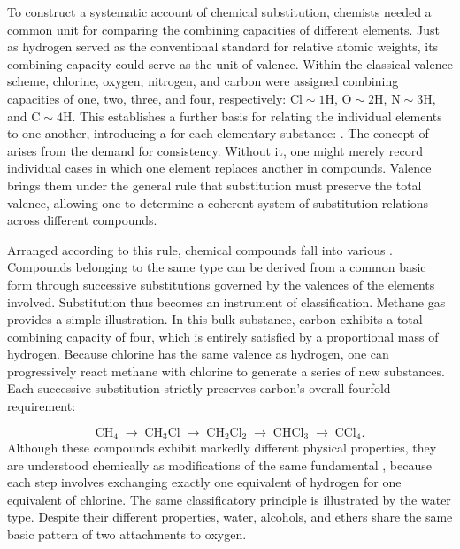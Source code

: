 \documentclass[submitted,12pt]{article}
\begin{document}
To construct a systematic account of chemical substitution, chemists needed a common unit for comparing the combining capacities of different elements. Just as hydrogen served as the conventional standard for relative atomic weights, its combining capacity could serve as the unit of valence. Within the classical valence scheme, chlorine, oxygen, nitrogen, and carbon were assigned combining capacities of one, two, three, and four, respectively: $\mathrm{Cl}\sim 1\mathrm{H}$, $\mathrm{O}\sim 2\mathrm{H}$, $\mathrm{N}\sim 3\mathrm{H}$, and $\mathrm{C}\sim 4\mathrm{H}$. This establishes a further basis for relating the individual elements to one another, introducing a  for each elementary substance:  . The concept of  arises from the demand for consistency.  Without it, one might merely record individual cases in which one element replaces another in compounds. Valence brings them under the general rule that substitution must preserve the total valence, allowing one to determine a coherent system of substitution relations across different compounds.

Arranged according to this rule, chemical compounds fall into various   . Compounds belonging to the same type can be derived from a common basic form through successive substitutions governed by the valences of the elements involved. Substitution thus becomes an instrument of classification. Methane gas provides a simple illustration. In this bulk substance, carbon exhibits a total combining capacity of four, which is entirely satisfied by a proportional mass of hydrogen. Because chlorine has the same valence as hydrogen, one can progressively react methane with chlorine to generate a series of new substances. Each successive substitution strictly preserves carbon's overall fourfold requirement: 

\[
\mathrm{CH}_4
\;\longrightarrow\;
\mathrm{CH}_3\mathrm{Cl}
\;\longrightarrow\;
\mathrm{CH}_2\mathrm{Cl}_2
\;\longrightarrow\;
\mathrm{CHCl}_3
\;\longrightarrow\;
\mathrm{CCl}_4.
\]
%
Although these compounds exhibit markedly different physical properties, they are understood chemically as modifications of the same fundamental , because each step involves exchanging exactly one equivalent of hydrogen for one equivalent of chlorine. The same classificatory principle is illustrated by the water type. Despite their different properties, water, alcohols, and ethers share the same basic pattern of two attachments to oxygen.
\end{document}
